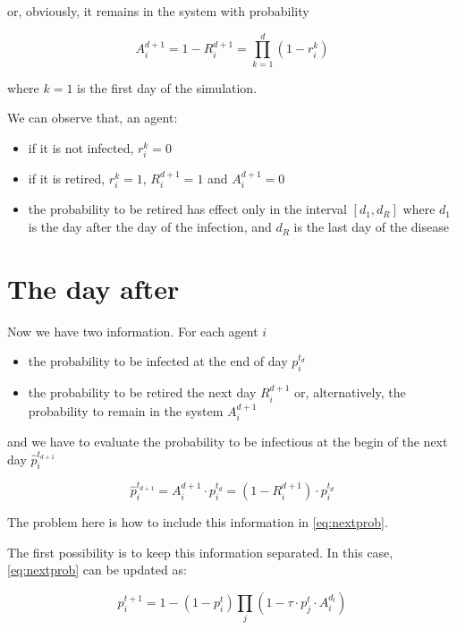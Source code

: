 \documentclass[12pt, a4paper]{article}
\newcommand{\expr}[1]{\left(#1\right)}
\begin{document}
or, obviously, it remains in the system with probability

\begin{equation}
     A_i^{d+1} = 1 - R_i^{d+1} = \prod_{k=1}^{d}(1-r^k_i)
\end{equation}

where $k=1$ is the first day of the simulation.

We can observe that, an agent:
\begin{itemize}
    \item if it is not infected, $r^k_i = 0$
    \item if it is retired, $r^k_i = 1$, $R_i^{d+1} = 1$ and $A_i^{d+1} = 0$
    \item the probability to be retired has effect only in the interval $[d_1, d_R]$ where $d_1$ is the day after the day of the infection, and $d_R$ is the last day of the disease
\end{itemize}


\section{The day after}

Now we have two information. For each agent $i$

\begin{itemize}
    \item the probability to be infected at the end of day $p_i^{t_d}$
    \item the probability to be retired the next day $R_i^{d+1}$ or, alternatively, the probability to remain in the system $A_i^{d+1}$
\end{itemize}

and we have to evaluate the probability to be infectious at the begin of the next day $\hat{p}_i^{t_{d+1}}$

\begin{equation}
     \hat{p}_i^{t_{d+1}} = A_i^{d+1}\cdot{p_i^{t_d}} = \expr{1 - R_i^{d+1}}\cdot{p_i^{t_d}}
\end{equation}

The problem here is how to include this information in \ref{eq:nextprob}.

The first possibility is to keep this information separated. In this case, \ref{eq:nextprob} can be updated as:

\begin{equation}
     p_{i}^{t+1} = 1 - \expr{1 - p_i^t} \prod_{j}\expr{1 - \tau{}\cdot{p_j^t}\cdot{A_i^{d_t}}}
\end{equation}
\end{document}

